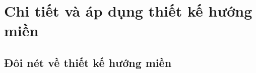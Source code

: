 \documentclass{article}
\begin{document}
% 
% 

\section{Chi tiết và áp dụng thiết kế hướng miền}
\subsection{Đôi nét về thiết kế hướng miền}


% 

\end{document}
